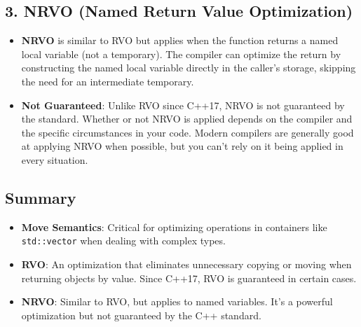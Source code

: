 \documentclass{article}
\begin{document}
\subsection*{3. NRVO (Named Return Value Optimization)}
\begin{itemize}
    \item \textbf{NRVO} is similar to RVO but applies when the function returns a named local variable (not a temporary). The compiler can optimize the return by constructing the named local variable directly in the caller’s storage, skipping the need for an intermediate temporary.
    \item \textbf{Not Guaranteed}: Unlike RVO since C++17, NRVO is not guaranteed by the standard. Whether or not NRVO is applied depends on the compiler and the specific circumstances in your code. Modern compilers are generally good at applying NRVO when possible, but you can't rely on it being applied in every situation.
\end{itemize}

\subsection*{Summary}
\begin{itemize}
    \item \textbf{Move Semantics}: Critical for optimizing operations in containers like \texttt{std::vector} when dealing with complex types.
    \item \textbf{RVO}: An optimization that eliminates unnecessary copying or moving when returning objects by value. Since C++17, RVO is guaranteed in certain cases.
    \item \textbf{NRVO}: Similar to RVO, but applies to named variables. It's a powerful optimization but not guaranteed by the C++ standard.
\end{itemize}
\end{document}
